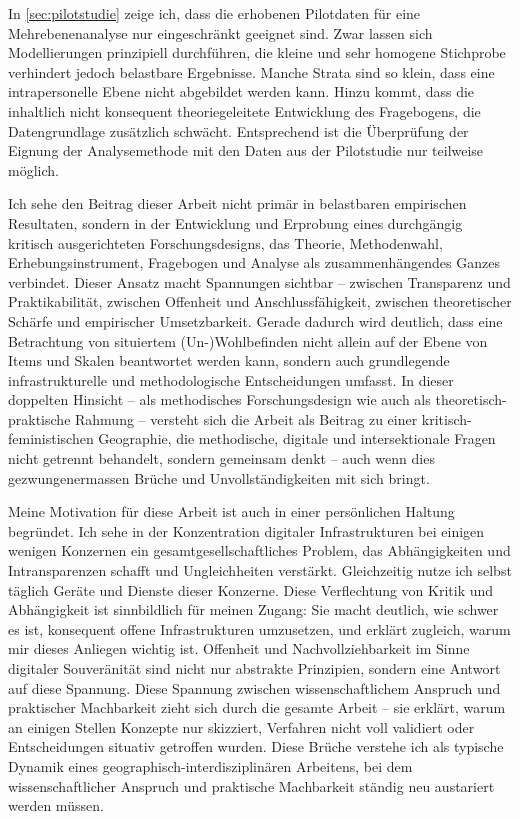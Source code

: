 In \cref{sec:pilotstudie} zeige ich, dass die erhobenen Pilotdaten für eine  Mehrebenenanalyse nur eingeschränkt geeignet sind. Zwar lassen sich Modellierungen prinzipiell durchführen, die kleine und sehr homogene Stichprobe verhindert jedoch belastbare Ergebnisse. Manche Strata sind so klein, dass eine intrapersonelle Ebene nicht abgebildet werden kann. Hinzu kommt, dass die inhaltlich nicht konsequent theoriegeleitete Entwicklung des Fragebogens, die Datengrundlage zusätzlich schwächt. Entsprechend ist die Überprüfung der Eignung der Analysemethode mit den Daten aus der Pilotstudie nur teilweise möglich.

Ich sehe den Beitrag dieser Arbeit nicht primär in belastbaren empirischen Resultaten, sondern in der Entwicklung und Erprobung eines durchgängig kritisch ausgerichteten Forschungsdesigns, das Theorie, Methodenwahl, Erhebungsinstrument, Fragebogen und Analyse als zusammenhängendes Ganzes verbindet. Dieser Ansatz macht Spannungen sichtbar -- zwischen Transparenz und Praktikabilität, zwischen Offenheit und Anschlussfähigkeit, zwischen theoretischer Schärfe und empirischer Umsetzbarkeit. Gerade dadurch wird deutlich, dass eine  Betrachtung von situiertem (Un\nobreakdash-)Wohlbefinden nicht allein auf der Ebene von Items und Skalen beantwortet werden kann, sondern auch grundlegende infrastrukturelle und methodologische Entscheidungen umfasst. In dieser doppelten Hinsicht -- als methodisches Forschungsdesign wie auch als theoretisch-praktische Rahmung -- versteht sich die Arbeit als Beitrag zu einer kritisch-feministischen Geographie, die methodische, digitale und intersektionale Fragen nicht getrennt behandelt, sondern gemeinsam denkt -- auch wenn dies gezwungenermassen Brüche und Unvollständigkeiten mit sich bringt.

Meine Motivation für diese Arbeit ist auch in einer persönlichen Haltung begründet. Ich sehe in der Konzentration digitaler Infrastrukturen bei einigen wenigen Konzernen ein gesamtgesellschaftliches Problem, das Abhängigkeiten und Intransparenzen schafft und Ungleichheiten verstärkt. Gleichzeitig nutze ich selbst täglich Geräte und Dienste dieser Konzerne. Diese Verflechtung von Kritik und Abhängigkeit ist sinnbildlich für meinen Zugang: Sie macht deutlich, wie schwer es ist, konsequent offene Infrastrukturen umzusetzen, und erklärt zugleich, warum mir dieses Anliegen wichtig ist. Offenheit und Nachvollziehbarkeit im Sinne digitaler Souveränität sind nicht nur abstrakte Prinzipien, sondern eine Antwort auf diese Spannung. Diese Spannung zwischen wissenschaftlichem Anspruch und praktischer Machbarkeit zieht sich durch die gesamte Arbeit -- sie erklärt, warum an einigen Stellen Konzepte nur skizziert, Verfahren nicht voll validiert oder Entscheidungen situativ getroffen wurden. Diese Brüche verstehe ich als typische Dynamik eines geographisch-interdisziplinären Arbeitens, bei dem wissenschaftlicher Anspruch und praktische Machbarkeit ständig neu austariert werden müssen.

